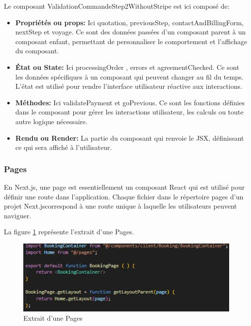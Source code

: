 \documentclass[12pt]{report}
\begin{document}
			Le composant ValidationCommandeStep2WithoutStripe est ici composé de:

			\begin{itemize}
				\item \textbf{Propriétés ou props:} Ici quotation, previousStep, contactAndBillingForm, nextStep et voyage. Ce sont des données passées d'un composant parent à un composant enfant, permettant de personnaliser le comportement et l'affichage du composant.
				\item \textbf{État ou State:} Ici processingOrder , errors et agreementChecked. Ce sont les données spécifiques à un composant qui peuvent changer au fil du temps. L'état est utilisé pour rendre l'interface utilisateur réactive aux interactions.
				\item \textbf{Méthodes:} Ici validatePayment et goPrevious. Ce sont les fonctions définies dans le composant pour gérer les interactions utilisateur, les calculs ou toute autre logique nécessaire.
				\item \textbf{Rendu ou Render:} La partie du composant qui renvoie le JSX, définissant ce qui sera affiché à l'utilisateur.
			\end{itemize}

			\subsubsection{Pages}
			\hspace{15pt} En Next.js, une page est essentiellement un composant React qui est utilisé pour définir une route dans l'application. Chaque fichier dans le répertoire pages d'un projet Next.jscorrespond à une route unique à laquelle les utilisateurs peuvent naviguer.
			
			La figure \ref{fig:pages} représente l'extrait d'une Pages.
			
			\begin{figure}[h]
				\centering
				\includegraphics[width=\textwidth]{pages.jpg}
				\caption{Extrait d'une Pages}
				\label{fig:pages}
			\end{figure}
			\FloatBarrier
\end{document}
